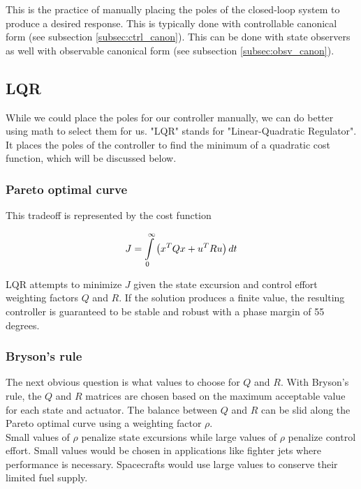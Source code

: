 \documentclass[10pt,conference,compsoc]{IEEEtran}
\begin{document}
This is the practice of manually placing the poles of the closed-loop system to
produce a desired response. This is typically done with controllable canonical
form (see subsection \ref{subsec:ctrl_canon}). This can be done with state
observers as well with observable canonical form (see subsection
\ref{subsec:obsv_canon}).

\subsection{LQR}

While we could place the poles for our controller manually, we can do better
using math to select them for us. "LQR" stands for "Linear-Quadratic Regulator".
It places the poles of the controller to find the minimum of a quadratic cost
function, which will be discussed below.

\subsubsection{Pareto optimal curve}

This tradeoff is represented by the cost function

\begin{equation*}
  J = \int\limits_0^\infty \left(x^T Q x + u^T R u \right) dt \\
\end{equation*}

LQR attempts to minimize $J$ given the \gls{state} excursion and control effort
weighting factors $Q$ and $R$. If the solution produces a finite value, the
resulting controller is guaranteed to be stable and robust with a phase margin
of 55 degrees.

\subsubsection{Bryson's rule}

The next obvious question is what values to choose for $Q$ and $R$. With
Bryson's rule, the $Q$ and $R$ matrices are chosen based on the maximum
acceptable value for each \gls{state} and actuator. The balance between $Q$ and
$R$ can be slid along the Pareto optimal curve using a weighting factor $\rho$.
\\

Small values of $\rho$ penalize \gls{state} excursions while large values of
$\rho$ penalize control effort. Small values would be chosen in applications
like fighter jets where performance is necessary. Spacecrafts would use large
values to conserve their limited fuel supply.
\end{document}
